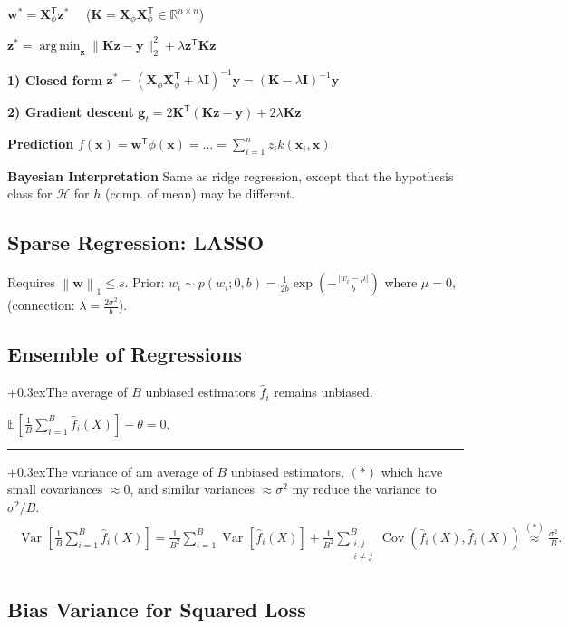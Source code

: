\documentclass[a4paper,10pt,twoside]{extarticle}
\newcommand{\R}{\mathbb{R}}
\newcommand{\cH}{\mathcal{H}}
\newcommand{\abs}[1]{\left\lvert #1 \right\rvert}
\newcommand{\norm}[1]{\left\lVert #1 \right\rVert}
\newcommand{\snorm}[1]{\lVert #1 \rVert}
\newcommand{\Var}[2][]{\operatorname{Var}_{#1}\left[ #2 \right]}
\newcommand{\Exp}[2][]{{\mathbb{E}_{#1}}\left[ #2
\right]}
\newcommand{\Cov}[1]{\operatorname{Cov}\left(#1 \right)}
\newcommand*{\T}{\mathsf{T}}
\DeclareMathOperator*{\argmin}{arg\,min}
\newcommand{\mat}[1]{\mathbf{#1}}
\renewcommand{\vec}[1]{\mathbf{#1}}
\newcommand{\vg}{\vec{g}}
\newcommand{\vw}{\vec{w}}
\newcommand{\vx}{\vec{x}}
\newcommand{\vy}{\vec{y}}
\newcommand{\vz}{\vec{z}}
\newcommand{\MI}{\mat{I}}
\newcommand{\MK}{\mat{K}}
\newcommand{\MX}{\mat{X}}
\newcommand{\emptyarg}[1][]{\ifthenelse{\isempty{#1}}{}{\ (#1)}}
\newcommand{\Thm}[1][]{%
\color{custtitlecolor}{\textbf{T.\emptyarg[#1]}}
\kern+0.3ex}
\newcommand{\sep}{\vspace{0pt}\noindent\hrule\vspace{0pt}}
\begin{document}
\begin{landscape}
\begin{multicols*}{3}
$\vw^*=\MX_\phi^\T\vz^*$ \, 
\, ($\MK=\MX_\phi\MX_\phi^\T\in\R^{n\times n}$)

$\vz^*=\argmin_{\vz} \snorm{\MK\vz-\vy}_2^2 + \lambda\vz^\T\MK\vz $

\textbf{1) Closed form} $\vz^*=(\MX_\phi\MX_\phi^\T+\lambda\MI)^{-1}\vy
=(\MK-\lambda\MI)^{-1}\vy$

\textbf{2) Gradient descent} $\vg_t=2\MK^\T(\MK\vz-\vy) + 2 \lambda\MK\vz$

\textbf{Prediction} $f(\vx)={\vw}^\T\phi(\vx)=\ldots=\sum_{i=1}^n
z_ik(\vx_i,\vx)$

\textbf{Bayesian Interpretation} Same as ridge regression, except that the
hypothesis class for $\cH$ for $h$ (comp. of mean) may be different.

\subsection{Sparse Regression: LASSO}

Requires $\norm{\vw}_1\leq s$. Prior: $w_i\sim
p(w_i;0,b)=\frac{1}{2b}\exp\left(-\frac{\abs{w_i-\mu}}{b}\right)$ where $\mu=0$,
(connection: $\lambda=\frac{2\sigma^2}{b}$).

\subsection{Ensemble of Regressions}

\Thm The average of $B$ unbiased estimators $\hat{f}_i$ remains unbiased.

$
\Exp{\frac{1}{B}\sum_{i=1}^B \hat{f}_i(X)} - \theta = 0.
$

\sep

\Thm The variance of am average of $B$ unbiased estimators, $(*)$ which have
small covariances $\approx 0$, and similar variances $\approx\sigma^2$ my reduce the
variance to $\sigma^2/B$.
\begin{gather*}
\begin{align*}
\Var{\frac{1}{B}\sum_{i=1}^B \hat{f}_i(X)}
=
\frac{1}{B^2}\sum_{i=1}^B\Var{ \hat{f}_i(X)}
+
\frac{1}{B^2}\sum_{\substack{i,j\\i\neq j}}^B\Cov{\hat{f}_i(X),\hat{f}_i(X)}
\stackrel{(*)}{\approx}\frac{\sigma^2}{B}.
\end{align*}
\end{gather*}

\subsection{Bias Variance for Squared Loss}


\end{multicols*}
\end{landscape}
\end{document}
